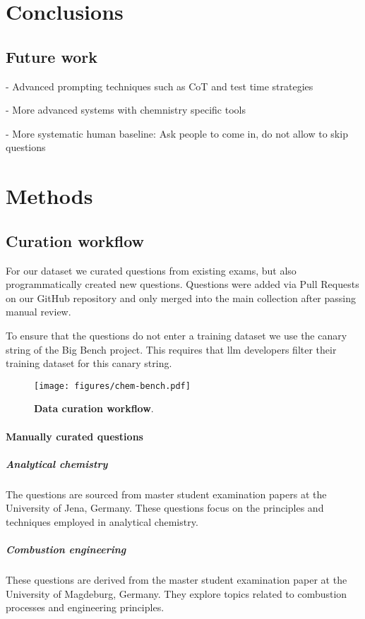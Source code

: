 \documentclass[11pt, oneside]{article}
\begin{document}
\section{Conclusions}

\subsection{Future work}
- Advanced prompting techniques such as CoT and test time strategies

- More advanced systems with chemnistry specific tools

- More systematic human baseline: Ask people to come in, do not allow to skip questions

\section{Methods}

\subsection{Curation workflow}\label{sec:curation}
For our dataset we curated questions from existing exams, but also programmatically created new questions.
Questions were added via Pull Requests on our GitHub repository and only merged into the main collection after passing manual review.

To ensure that the questions do not enter a training dataset we use the canary string of the Big Bench project.
This requires that \Gls{llm} developers filter their training dataset for this canary string.

\begin{figure}
    \texttt{[image: figures/chem-bench.pdf]}
        \caption{\textbf{Data curation workflow}.}
\end{figure}

\paragraph{Manually curated questions}

\subparagraph{Analytical chemistry}
The questions are sourced from master student examination papers at the University of Jena, Germany. These questions focus on the principles and techniques employed in analytical chemistry.

\subparagraph{Combustion engineering}
These questions are derived from the master student examination paper at the University of Magdeburg, Germany. They explore topics related to combustion processes and engineering principles.
\end{document}
